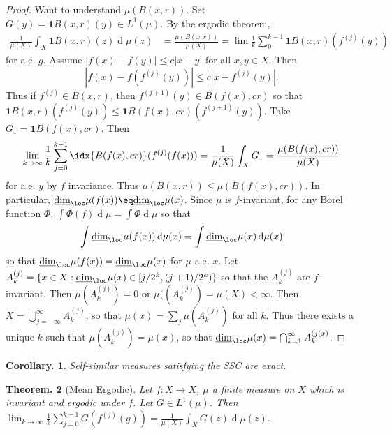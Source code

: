 \documentclass[11pt, a4paper]{memoir}
\theoremstyle{change}
\newtheorem{theorem}{Theorem.}[section]
\newtheorem{corollary}[theorem]{Corollary.}
\theoremstyle{plain}
\theoremstyle{nonumberplain}
\newtheorem{proof}{Proof}
\renewcommand{\d}[1]{\ensuremath{\operatorname{d}\!{#1}}}
\newcommand{\idc}{\mathbf{1}}
\numberwithin{equation}{section}
\begin{document}
\begin{proof}
    Want to understand $\mu(B(x,r))$.
    Set $G(y)=\idc{B(x,r)}(y)\in L^1(\mu)$.
    By the ergodic theorem,
    \begin{align*}
        \frac{1}{\mu(X)}\int_X\idc{B(x,r)}(z)\d{\mu(z)}&=\frac{\mu(B(x,r))}{\mu(X)}=\lim\frac{1}{k}\sum_{0}^{k-1}\idc{B(x,r)}(f^{(j)}(y))
    \end{align*}
    for a.e. $g$.
    Assume $|f(x)-f(y)|\leq c|x-y|$ for all $x,y\in X$.
    Then
    \begin{equation*}
        |f(x)-f(f^{(j)}(y))|\leq c|x-f^{(j)}(y)|.
    \end{equation*}
    Thus if $f^{(j)}\in B(x,r)$, then $f^{(j+1)}(y)\in B(f(x),cr)$ so that $\idc{B(x,r)}(f^{(j)}(y))\leq\idc{B(f(x),cr)}(f^{(j+1)}(y))$.
    Take $G_1=\idc{B(f(x),cr)}$.
    Then
    \begin{equation*}
        \lim_{k\to\infty}\frac{1}{k}\sum_{j=0}^{k-1}\idx{B(f(x),cr)}(f^{(j)}(f(x)))=\frac{1}{\mu(X)}\int_X G_1=\frac{\mu(B(f(x),cr))}{\mu(X)}
    \end{equation*}
    for a.e. $y$ by $f$ invariance.
    Thus $\mu(B(x,r))\leq\mu(B(f(x),cr))$.
    In particular, $\underline{\dim}_{\loc}\mu(f(x))\eq\underline{\dim}_{\loc}\mu(x)$.
    Since $\mu$ is $f$-invariant, for any Borel function $\Phi$, $\int\Phi(f)\d{\mu}=\int\Phi\d{\mu}$ so that
    \begin{equation*}
        \int\underline{\dim}_{\loc}\mu(f(x))\d{\mu(x)}=\int\underline{\dim}_{\loc}\mu(x)\d{\mu(x)}
    \end{equation*}
    so that $\underline{\dim}_{\loc}\mu(f(x))=\underline{\dim}_{\loc}\mu(x)$ for $\mu$ a.e. $x$.
    Let $A_k^{(j)}=\{x\in X:\underline{\dim}_{\loc}\mu(x)\in[j/2^k,(j+1)/2^k)\}$ so that the $A_k^{(j)}$ are $f$-invariant.
    Then $\mu(A_k^{(j)})=0$ or $\mu((A_k^{(j)})=\mu(X)<\infty$.
    Then $X=\bigcup_{j=-\infty}^\infty A_k^{(j)}$, so that $\mu(x)=\sum_j\mu(A_k^{(j)})$ for all $k$.
    Thus there exists a unique $k$ such that $\mu(A_k^{(j)})=\mu(x)$, so that $\underline{\dim}_{\loc}\mu(x)=\bigcap_{k=1}^\infty A_k^{(j(x)}$.
\end{proof}
\begin{corollary}
    Self-similar measures satisfying the SSC are exact.
\end{corollary}
\begin{theorem}[Mean Ergodic]
    Let $f:X\to X$, $\mu$ a finite measure on $X$ which is invariant and ergodic under $f$.
    Let $G\in L^1(\mu)$.
    Then $\lim_{k\to\infty}\frac{1}{k}\sum_{j=0}^{k-1}G(f^{(j)}(g))=\frac{1}{\mu(X)}\int_XG(z)\d{\mu(z)}$.
\end{theorem}
\end{document}
